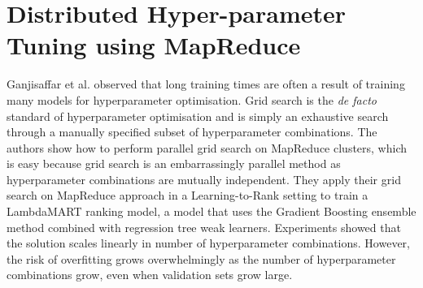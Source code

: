 \section{Distributed Hyper-parameter Tuning using MapReduce}
Ganjisaffar et al. \cite{Ganjisaffar2011, Ganjisaffar2011b} observed that long training times are often a result of training many models for hyperparameter optimisation. Grid search is the \emph{de facto} standard of hyperparameter optimisation and is simply an exhaustive search through a manually specified subset of hyperparameter combinations. The authors show how to perform parallel grid search on MapReduce clusters, which is easy because grid search is an embarrassingly parallel method as hyperparameter combinations are mutually independent. They apply their grid search on MapReduce approach in a Learning-to-Rank setting to train a LambdaMART \cite{Wu2008} ranking model, a model that uses the Gradient Boosting \cite{Friedman2002} ensemble method combined with regression tree weak learners. Experiments showed that the solution scales linearly in number of hyperparameter combinations. However, the risk of overfitting grows overwhelmingly as the number of hyperparameter combinations grow, even when validation sets grow large.

